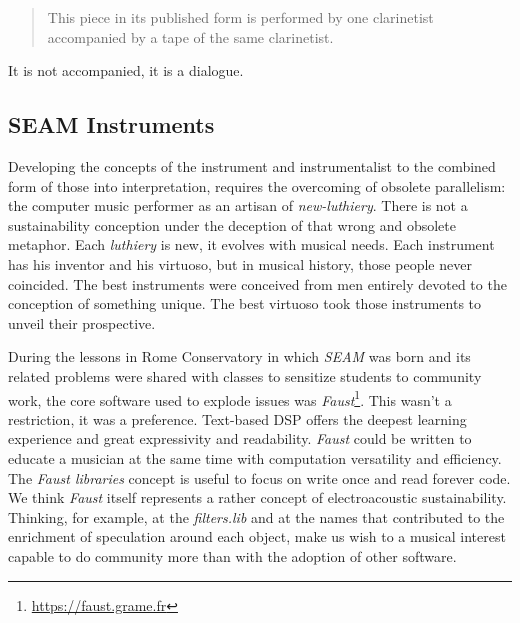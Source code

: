 \documentclass[twoside,a4paper]{article}
\begin{document}
\begin{quote}
This piece in its published form is performed by one clarinetist accompanied by
a tape of the same clarinetist.
\end{quote}

It is not accompanied, it is a dialogue.


\subsection{SEAM Instruments}

Developing the concepts of the instrument and instrumentalist to the combined
form of those into interpretation, \cite{lem16,mp01,savi85} requires the
overcoming of obsolete parallelism: the computer music performer as an artisan
of \emph{new-luthiery}. There is not a sustainability conception under the
deception of that wrong and obsolete metaphor. Each \emph{luthiery} is new, it
evolves with musical needs. Each instrument has his inventor and his virtuoso,
but in musical history, those people never coincided. The best instruments were
conceived from men entirely devoted to the conception of something unique. The
best virtuoso took those instruments to unveil their prospective.


During the lessons in Rome Conservatory in which \emph{SEAM} was born and its
related problems were shared with classes to sensitize students to community
work, the core software used to explode issues was
\emph{Faust}\footnote{\url{https://faust.grame.fr}}. This wasn't a restriction,
it was a preference. Text-based DSP offers the deepest learning experience and
great expressivity and readability. \emph{Faust} could be written to educate a
musician at the same time with computation versatility and efficiency. The
\emph{Faust libraries} concept is useful to focus on write once and read forever
code. We think \emph{Faust} itself represents a rather concept of electroacoustic
sustainability. Thinking, for example, at the \emph{filters.lib} and at the names
that contributed to the enrichment of speculation around each object, make us
wish to a musical interest capable to do community more than with the adoption
of other software.
\end{document}
